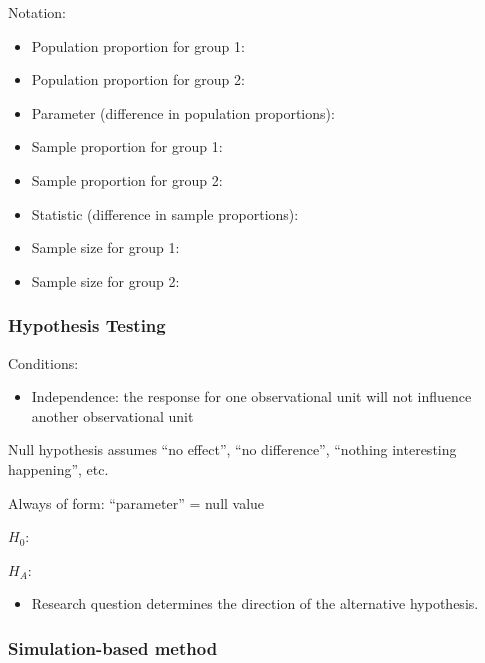 \documentclass[
]{report}
\providecommand{\tightlist}{%
  \setlength{\itemsep}{0pt}\setlength{\parskip}{0pt}}
\newcommand{\rgi}{\hspace{24pt}}  %
\begin{document}
Notation:

\begin{itemize}
\item
  Population proportion for group 1:
\item
  Population proportion for group 2:
\item
  Parameter (difference in population proportions):
\item
  Sample proportion for group 1:
\item
  Sample proportion for group 2:
\item
  Statistic (difference in sample proportions):
\item
  Sample size for group 1:
\item
  Sample size for group 2:
\end{itemize}


\subsubsection*{Hypothesis Testing}\label{hypothesis-testing-2}

Conditions:

\begin{itemize}
\tightlist
\item
  Independence: the response for one observational unit will not influence another observational unit
\end{itemize}

Null hypothesis assumes ``no effect'', ``no difference'', ``nothing interesting happening'', etc.

\rgi Always of form: ``parameter'' = null value

\(H_0:\)

\vspace{0.2in}

\(H_A:\)

\vspace{0.2in}

\begin{itemize}
\tightlist
\item
  Research question determines the direction of the alternative hypothesis.
\end{itemize}

\subsubsection*{Simulation-based method}\label{simulation-based-method-4}
\end{document}

